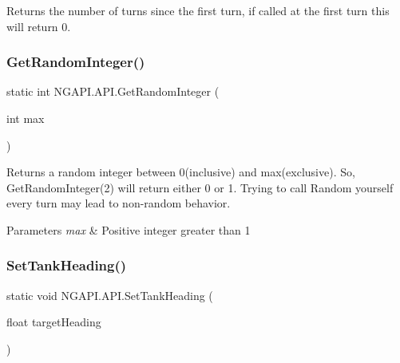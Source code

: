 Returns the number of turns since the first turn, if called at the first turn this will return 0. 

\mbox{\label{class_n_g_a_p_i_1_1_a_p_i_a63cedf132a30d25da3b4aa8e7a0d16db}} 
\subsubsection{\texorpdfstring{Get\+Random\+Integer()}{GetRandomInteger()}}
{\footnotesize\ttfamily static int N\+G\+A\+P\+I.\+A\+P\+I.\+Get\+Random\+Integer (\begin{DoxyParamCaption}\item[{int}]{max }\end{DoxyParamCaption})\hspace{0.3cm}{\ttfamily [static]}}



Returns a random integer between 0(inclusive) and max(exclusive). So, Get\+Random\+Integer(2) will return either 0 or 1. Trying to call Random yourself every turn may lead to non-\/random behavior. 


\begin{DoxyParams}{Parameters}
{\em max} & Positive integer greater than 1\\
\hline
\end{DoxyParams}
\mbox{\label{class_n_g_a_p_i_1_1_a_p_i_a7bb4fcbbc23b3f95f372c7276c92386e}} 
\subsubsection{\texorpdfstring{Set\+Tank\+Heading()}{SetTankHeading()}}
{\footnotesize\ttfamily static void N\+G\+A\+P\+I.\+A\+P\+I.\+Set\+Tank\+Heading (\begin{DoxyParamCaption}\item[{float}]{target\+Heading }\end{DoxyParamCaption})\hspace{0.3cm}{\ttfamily [static]}}



